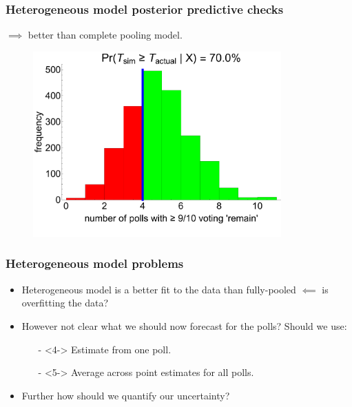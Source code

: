 \documentclass[handout]{beamer}
\begin{document}
\begin{frame}
	\frametitle{Heterogeneous model posterior predictive checks}
	$\implies$ better than complete pooling model.
	
	\begin{figure}[ht]
		\centerline{\includegraphics[width=0.85\textwidth]{figures/lec6_euHeteroPPCHist2.pdf}}
	\end{figure}
	
\end{frame}

\begin{frame}
	\frametitle{Heterogeneous model problems}
	\begin{itemize}
		\item<2-> Heterogeneous model is a better fit to the data than fully-pooled $\impliedby$ is overfitting the data?
		\item<3-> However not clear what we should now forecast for the polls? Should we use:
		\begin{itemize}
			\item[-]<4-> Estimate from one poll.
			\item[-]<5-> Average across point estimates for all polls.
		\end{itemize}
		\item<6-> Further how should we quantify our uncertainty?
	\end{itemize}
	
\end{frame}
\end{document}
